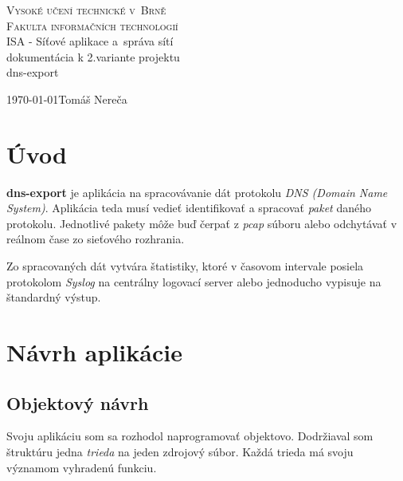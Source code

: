 \documentclass{article}
\begin{document}
    \begin{titlepage}
        \begin{center}
            \textsc{\Huge Vysoké učení technické v~Brně\\
            		\huge Fakulta informačních technologií\\}
            {\LARGE ISA - Síťové aplikace a~správa sítí\\}\vspace{2em}
            {\Large dokumentácia k 2.variante projektu\\}\vspace{2em}
            \Huge dns-export\\
        \end{center}
        {\Large \today \hfill Tomáš Nereča}\vspace{-2em}
    \end{titlepage}

    \tableofcontents
        \thispagestyle{empty}
        \newpage
        \setcounter{page}{1}
    \newpage
    
    \section{Úvod}

        \textbf{dns-export} je aplikácia na spracovávanie dát protokolu \emph{DNS (Domain Name System)}.
        Aplikácia teda musí vedieť identifikovať a spracovať \emph{paket} daného protokolu.
        Jednotlivé pakety môže buď čerpať z \emph{pcap} súboru alebo odchytávať v reálnom čase
        zo sieťového rozhrania.

        Zo spracovaných dát vytvára štatistiky, ktoré v časovom intervale posiela protokolom \emph{Syslog}
        na centrálny logovací server alebo jednoducho vypisuje na štandardný výstup. 
    
    \section{Návrh aplikácie}

        \subsection{Objektový návrh}
        Svoju aplikáciu som sa rozhodol naprogramovať objektovo. Dodržiaval som štruktúru jedna \emph{trieda}
        na jeden zdrojový súbor. Každá trieda má svoju významom vyhradenú funkciu. 
\end{document}
